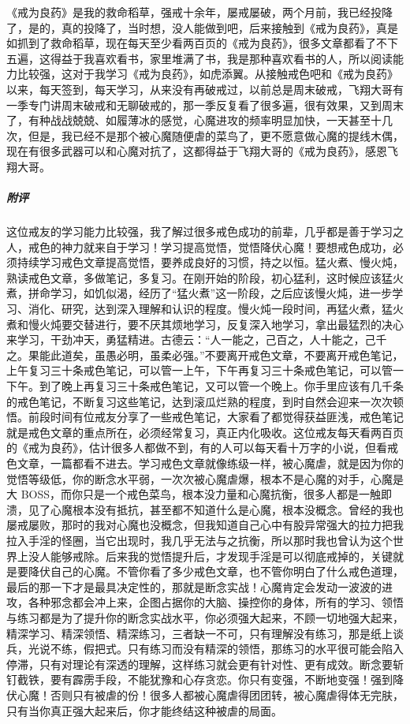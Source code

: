 \begin{case}
    《戒为良药》是我的救命稻草，强戒十余年，屡戒屡破，两个月前，我已经投降了，是的，真的投降了，当时想，没人能做到吧，后来接触到《戒为良药》，真是如抓到了救命稻草，现在每天至少看两百页的《戒为良药》，很多文章都看了不下五遍，这得益于我喜欢看书，家里堆满了书，我是那种喜欢看书的人，所以阅读能力比较强，这对于我学习《戒为良药》，如虎添翼。从接触戒色吧和《戒为良药》以来，每天签到，每天学习，从来没有再破戒过，以前总是周末破戒，飞翔大哥有一季专门讲周末破戒和无聊破戒的，那一季反复看了很多遍，很有效果，又到周末了，有种战战兢兢、如履薄冰的感觉，心魔进攻的频率明显加快，一天甚至十几次，但是，我已经不是那个被心魔随便虐的菜鸟了，更不愿意做心魔的提线木偶，现在有很多武器可以和心魔对抗了，这都得益于飞翔大哥的《戒为良药》，感恩飞翔大哥。
    \subparagraph{附评} 这位戒友的学习能力比较强，我了解过很多戒色成功的前辈，几乎都是善于学习之人，戒色的神力就来自于学习！学习提高觉悟，觉悟降伏心魔！要想戒色成功，必须持续学习戒色文章提高觉悟，要养成良好的习惯，持之以恒。猛火煮、慢火炖，熟读戒色文章，多做笔记，多复习。在刚开始的阶段，初心猛利，这时候应该猛火煮，拼命学习，如饥似渴，经历了“猛火煮”这一阶段，之后应该慢火炖，进一步学习、消化、研究，达到深入理解和认识的程度。慢火炖一段时间，再猛火煮，猛火煮和慢火炖要交替进行，要不厌其烦地学习，反复深入地学习，拿出最猛烈的决心来学习，干劲冲天，勇猛精进。古德云：“人一能之，己百之，人十能之，己千之。果能此道矣，虽愚必明，虽柔必强。”不要离开戒色文章，不要离开戒色笔记，上午复习三十条戒色笔记，可以管一上午，下午再复习三十条戒色笔记，可以管一下午。到了晚上再复习三十条戒色笔记，又可以管一个晚上。你手里应该有几千条的戒色笔记，不断复习这些笔记，达到滚瓜烂熟的程度，到时自然会迎来一次次顿悟。前段时间有位戒友分享了一些戒色笔记，大家看了都觉得获益匪浅，戒色笔记就是戒色文章的重点所在，必须经常复习，真正内化吸收。这位戒友每天看两百页的《戒为良药》，估计很多人都做不到，有的人可以每天看十万字的小说，但看戒色文章，一篇都看不进去。学习戒色文章就像练级一样，被心魔虐，就是因为你的觉悟等级低，你的断念水平弱，一次次被心魔虐爆，根本不是心魔的对手，心魔是大 BOSS，而你只是一个戒色菜鸟，根本没力量和心魔抗衡，很多人都是一触即溃，见了心魔根本没有抵抗，甚至都不知道什么是心魔，根本没概念。曾经的我也屡戒屡败，那时的我对心魔也没概念，但我知道自己心中有股异常强大的拉力把我拉入手淫的怪圈，当它出现时，我几乎无法与之抗衡，所以那时我也曾认为这个世界上没人能够戒除。后来我的觉悟提升后，才发现手淫是可以彻底戒掉的，关键就是要降伏自己的心魔。不管你看了多少戒色文章，也不管你明白了什么戒色道理，最后的那一下才是最具决定性的，那就是断念实战！心魔肯定会发动一波波的进攻，各种邪念都会冲上来，企图占据你的大脑、操控你的身体，所有的学习、领悟与练习都是为了提升你的断念实战水平，你必须强大起来，不顾一切地强大起来，精深学习、精深领悟、精深练习，三者缺一不可，只有理解没有练习，那是纸上谈兵，光说不练，假把式。只有练习而没有精深的领悟，那练习的水平很可能会陷入停滞，只有对理论有深透的理解，这样练习就会更有针对性、更有成效。断念要斩钉截铁，要有霹雳手段，不能犹豫和心存贪恋。你只有变强，不断地变强！强到降伏心魔！否则只有被虐的份！很多人都被心魔虐得团团转，被心魔虐得体无完肤，只有当你真正强大起来后，你才能终结这种被虐的局面。
\end{case}

